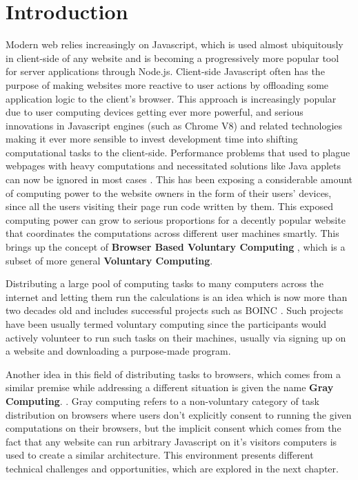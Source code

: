 \chapter{Introduction}
Modern web relies increasingly on Javascript, which is used almost ubiquitously in client-side of any website and is becoming a progressively more popular tool for server applications through Node.js. 
Client-side Javascript often has the purpose of making websites more reactive to user actions by offloading some application logic to the client's browser. This approach is increasingly popular due to user computing devices getting ever more powerful, and serious innovations in Javascript engines (such as Chrome V8) and related technologies making it ever more sensible to invest development time into shifting computational tasks to the client-side. Performance problems that used to plague webpages with heavy computations and necessitated solutions like Java applets can now be ignored in most cases \cite{fabisiak2017browser}.
This has been exposing a considerable amount of computing power to the website owners in the form of their users' devices, since all the users visiting their page run code written by them. This exposed computing power can grow to serious proportions for a decently popular website that coordinates the computations across different user machines smartly. This brings up the concept of \textbf{Browser Based Voluntary Computing} \cite{fabisiak2017browser}, which is a subset of more general \textbf{Voluntary Computing}.

Distributing a large pool of computing tasks to many computers across the internet and letting them run the calculations is an idea which is now more than two decades old and includes successful projects such as BOINC \cite{anderson2004boinc}. Such projects have been usually termed voluntary computing since the participants would actively volunteer to run such tasks on their machines, usually via signing up on a website and downloading a purpose-made program. 

Another idea in this field of distributing tasks to browsers, which comes from a similar premise while addressing a different situation is given the name \textbf{Gray Computing}. \cite{pathak2013texture}. Gray computing refers to a non-voluntary category of task distribution on browsers where users don't explicitly consent to running the given computations on their browsers, but the implicit consent which comes from the fact that any website can run arbitrary Javascript on it's visitors computers is used to create a similar architecture. This environment presents different technical challenges and opportunities, which are explored in the next chapter.

